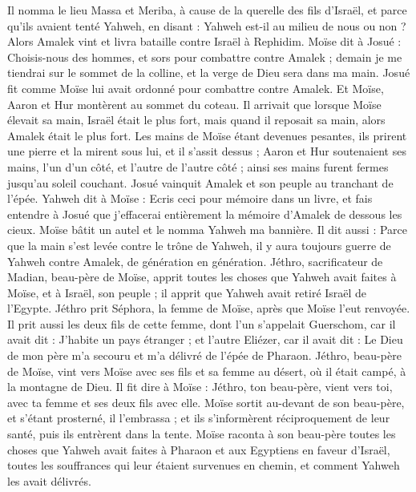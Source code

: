 \begin{multicols}{2}
Il nomma le lieu Massa et Meriba, à cause de la querelle des fils d'Israël, et parce qu'ils avaient tenté Yahweh, en disant : Yahweh est-il au milieu de nous ou non ?
Alors Amalek vint et livra bataille contre Israël à Rephidim.
Moïse dit à Josué : Choisis-nous des hommes, et sors pour combattre contre Amalek ; demain je me tiendrai sur le sommet de la colline, et la verge de Dieu sera dans ma main.
Josué fit comme Moïse lui avait ordonné pour combattre contre Amalek. Et Moïse, Aaron et Hur montèrent au sommet du coteau.
Il arrivait que lorsque Moïse élevait sa main, Israël était le plus fort, mais quand il reposait sa main, alors Amalek était le plus fort.
Les mains de Moïse étant devenues pesantes, ils prirent une pierre et la mirent sous lui, et il s'assit dessus ; Aaron et Hur soutenaient ses mains, l'un d’un côté, et l'autre de l’autre côté ; ainsi ses mains furent fermes jusqu'au soleil couchant.
Josué vainquit Amalek et son peuple au tranchant de l'épée.
Yahweh dit à Moïse : Ecris ceci pour mémoire dans un livre, et fais entendre à Josué que j'effacerai entièrement la mémoire d'Amalek de dessous les cieux.
Moïse bâtit un autel et le nomma Yahweh ma bannière.
Il dit aussi : Parce que la main s’est levée contre le trône de Yahweh, il y aura toujours guerre de Yahweh contre Amalek, de génération en génération.
\VerseOne{}Jéthro, sacrificateur de Madian, beau-père de Moïse, apprit toutes les choses que Yahweh avait faites à Moïse, et à Israël, son peuple ; il apprit que Yahweh avait retiré Israël de l'Egypte.
Jéthro prit Séphora, la femme de Moïse, après que Moïse l'eut renvoyée.
Il prit aussi les deux fils de cette femme, dont l'un s'appelait Guerschom, car il avait dit : J’habite un pays étranger ;
et l'autre Eliézer, car il avait dit : Le Dieu de mon père m'a secouru et m'a délivré de l'épée de Pharaon.
Jéthro, beau-père de Moïse, vint vers Moïse avec ses fils et sa femme au désert, où il était campé, à la montagne de Dieu.
Il fit dire à Moïse : Jéthro, ton beau-père, vient vers toi, avec ta femme et ses deux fils avec elle.
Moïse sortit au-devant de son beau-père, et s'étant prosterné, il l’embrassa ; et ils s’informèrent réciproquement de leur santé, puis ils entrèrent dans la tente.
Moïse raconta à son beau-père toutes les choses que Yahweh avait faites à Pharaon et aux Egyptiens en faveur d'Israël, toutes les souffrances qui leur étaient survenues en chemin, et comment Yahweh les avait délivrés.

\end{multicols}
